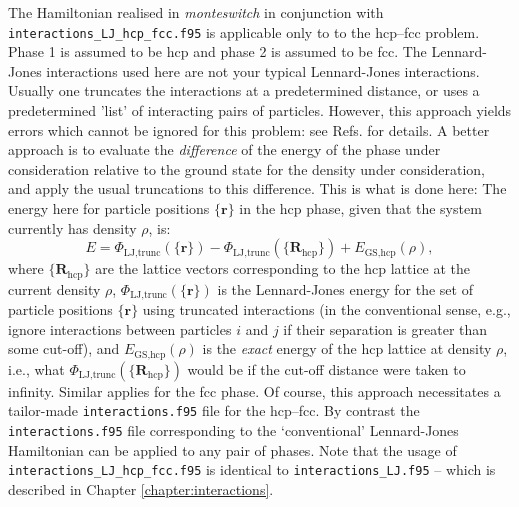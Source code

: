 \documentclass{report}
\begin{document}
The Hamiltonian realised in \emph{monteswitch} in conjunction with \texttt{interactions\_LJ\_hcp\_fcc.f95} is applicable only to
to the hcp--fcc problem. Phase 1 is assumed to be hcp and phase 2 is assumed to be fcc. The Lennard-Jones interactions
used here are not your typical Lennard-Jones interactions. Usually one truncates the interactions at
a predetermined distance, or uses a predetermined 'list' of interacting pairs of particles. However, this
approach yields errors which cannot be ignored for this problem: see Refs. \cite{thesis:Jackson,Jackson_2002} for details. A
better approach is to evaluate the \emph{difference} of the energy of the phase under consideration relative to the 
ground state for the density under consideration, and apply the usual truncations to this difference. This is what is done here:
The energy here for particle positions $\lbrace\mathbf{r}\rbrace$ in the hcp phase, given that the system currently has density $\rho$, is:
\begin{equation}
E = \Phi_{\text{LJ,trunc}}(\lbrace\mathbf{r}\rbrace)-\Phi_{\text{LJ,trunc}}(\lbrace\mathbf{R}_{\text{hcp}}\rbrace)
+ E_{\text{GS,hcp}}(\rho),
\end{equation}
where $\lbrace\mathbf{R}_{\text{hcp}}\rbrace$ are the lattice vectors corresponding to the hcp lattice at the current density $\rho$, 
$\Phi_{\text{LJ,trunc}}(\lbrace\mathbf{r}\rbrace)$ is the Lennard-Jones energy for the set of particle positions $\lbrace\mathbf{r}\rbrace$
using truncated interactions (in the conventional sense, e.g., ignore interactions between particles $i$ and $j$ if their separation is
greater than some cut-off), and $E_{\text{GS,hcp}}(\rho)$ is the \emph{exact} energy of the hcp lattice at density $\rho$, i.e., what 
$\Phi_{\text{LJ,trunc}}(\lbrace\mathbf{R}_{\text{hcp}}\rbrace)$ would be if the cut-off distance were taken to infinity. Similar applies
for the fcc phase.
Of course, this approach necessitates a tailor-made \texttt{interactions.f95} file for the hcp--fcc. By contrast the \texttt{interactions.f95}
file corresponding to the `conventional' Lennard-Jones Hamiltonian can be applied to any pair of phases.
Note that the usage of \texttt{interactions\_LJ\_hcp\_fcc.f95} is identical to \texttt{interactions\_LJ.f95} -- which is described in
Chapter \ref{chapter:interactions}.
\end{document}
